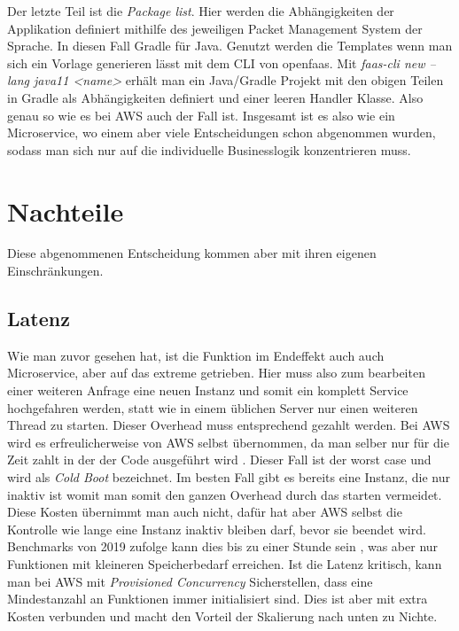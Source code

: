 \documentclass[12pt, a4paper]{article}
\begin{document}
\newline
Der letzte Teil ist die \emph{Package list}.
Hier werden die Abhängigkeiten der Applikation definiert mithilfe des jeweiligen Packet Management System der Sprache.
In diesen Fall Gradle für Java.
\newline
Genutzt werden die Templates wenn man sich ein Vorlage generieren lässt mit dem CLI von openfaas.
Mit \emph{faas-cli new --lang java11 <name>} erhält man ein Java/Gradle Projekt mit den obigen Teilen in Gradle als Abhängigkeiten definiert und einer leeren Handler Klasse.
Also genau so wie es bei \ac{AWS} auch der Fall ist.
\newline
Insgesamt ist es also wie ein Microservice, wo einem aber viele Entscheidungen schon abgenommen wurden, sodass man sich nur auf die individuelle Businesslogik konzentrieren muss.

\section{Nachteile}
Diese abgenommenen Entscheidung kommen aber mit ihren eigenen Einschränkungen.
\subsection{Latenz}
Wie man zuvor gesehen hat, ist die Funktion im Endeffekt auch auch Microservice, aber auf das extreme getrieben.
Hier muss also zum bearbeiten einer weiteren Anfrage eine neuen Instanz und somit ein komplett Service hochgefahren werden, statt wie in einem üblichen Server nur einen weiteren Thread zu starten.
\newline
Dieser Overhead muss entsprechend gezahlt werden.
Bei AWS wird es erfreulicherweise von AWS selbst übernommen, da man selber nur für die Zeit zahlt in der der Code ausgeführt wird \cite{aws_lambda_pricing}.
Dieser Fall ist der worst case und wird als \emph{Cold Boot} bezeichnet.
Im besten Fall gibt es bereits eine Instanz, die nur inaktiv ist womit man somit den ganzen Overhead durch das starten vermeidet.
Diese Kosten übernimmt man auch nicht, dafür hat aber AWS selbst die Kontrolle wie lange eine Instanz inaktiv bleiben darf, bevor sie beendet wird.
Benchmarks von 2019 zufolge kann dies bis zu einer Stunde sein \cite{aws_lambda_idle_timeout}, was aber nur Funktionen mit kleineren Speicherbedarf erreichen.
\newline
Ist die Latenz kritisch, kann man bei AWS mit \emph{Provisioned Concurrency} Sicherstellen, dass eine Mindestanzahl an Funktionen immer initialisiert sind\cite{aws_lambda_provisioned_concurrency}.
Dies ist aber mit extra Kosten verbunden und macht den Vorteil der Skalierung nach unten zu Nichte.
\end{document}
